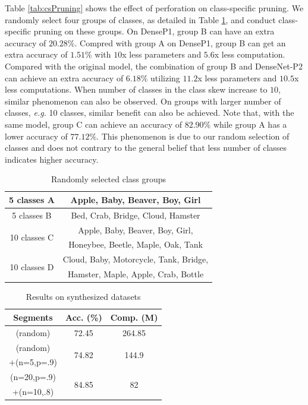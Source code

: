 \documentclass[pageno]{jpaper}
\begin{document}
Table \ref{tab:csPruning} shows the effect of perforation on class-specific pruning. We randomly select four groups of classes, as detailed in Table \ref{tab:classGroups}, and conduct class-specific pruning on these groups. On DenseP1, group B can have an extra accuracy of $20.28\%$. Compred with group A on DenseP1, group B can get an extra accuracy of $1.51\%$ with $10$x less parameters and $5.6$x less computation. Compared with the original model, the combination of group B and DenseNet-P2 can achieve an extra accuracy of $6.18\%$ utilizing $11.2$x less parameters and $10.5$x less computations. When number of classes in the class skew increase to $10$, similar phenomenon can also be observed. On groups with larger number of classes, \textit{e.g.} 10 classes, similar benefit can also be achieved. Note that, with the same model, group C can achieve an accuracy of $82.90\%$ while group A has a lower accuracy of $77.12\%$. This phenomenon is due to our random selection of classes and does not contrary to the general belief that less number of classes indicates higher accuracy. 





\begin{table}
    \centering
    \begin{tabular}{c|c}
    \hline
     5 classes A & Apple, Baby, Beaver, Boy, Girl \\
     \hline
     5 classes B & Bed, Crab, Bridge, Cloud, Hamster \\
     \hline
     \multirow{2}{*}{10 classes C} & Apple, Baby, Beaver, Boy, Girl, \\
       & Honeybee, Beetle, Maple, Oak, Tank \\
     \hline
     \multirow{2}{*}{10 classes D} & Cloud, Baby, Motorcycle, Tank, Bridge, \\
       & Hamster, Maple, Apple, Crab, Bottle\\
    \hline
    \end{tabular}
    \caption{Randomly selected class groups}
    \label{tab:classGroups}
\end{table}


\begin{table}
    \centering
    \begin{tabular}{c|cc}
    \hline
    Segments  & Acc. (\%)  & Comp. (M)    \\
    \hline
    (random)      & 72.45  & 264.85 \\
    \hline
    (random)      & \multirow{2}{*}{74.82}  & \multirow{2}{*}{144.9}\\
    +(n=5,p=.9) &   & \\
    \hline
    (n=20,p=.9)      & \multirow{2}{*}{84.85}  & \multirow{2}{*}{82} \\
    +(n=10,.8) &  & \\
    \hline

    
    \end{tabular}
    \caption{Results on synthesized datasets}
    \label{tab:synthe}
\end{table}
\end{document}
